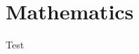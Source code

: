 \documentclass[introduction.tex]{subfiles}
\begin{document}
\section{Mathematics}

Test
\end{document}
